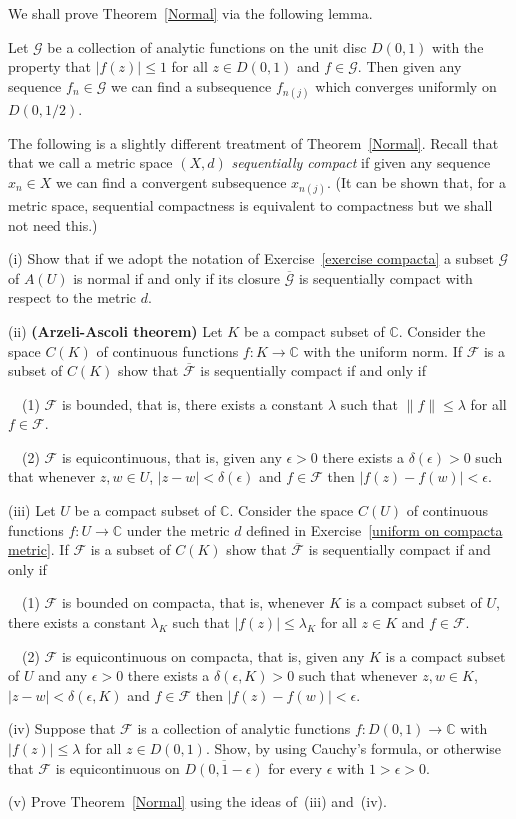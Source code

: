 We shall prove Theorem~\ref{Normal} via the following
lemma.
\begin{lemma} Let $\mathcal{G}$ be a collection
of analytic functions on the unit disc $D(0,1)$
with the property that $|f(z)|\leq 1$ for all $z\in D(0,1)$
and $f\in \mathcal{G}$. Then given any sequence
$f_{n}\in\mathcal{G}$ we can find a subsequence
$f_{n(j)}$ which converges uniformly on $D(0,1/2)$.
\end{lemma}                      
\begin{exercise} The following is a slightly different
treatment of Theorem~\ref{Normal}.
Recall that that we call a metric space $(X,d)$
\emph{sequentially compact} if given any sequence
$x_{n}\in X$ we can find a convergent subsequence
$x_{n(j)}$. (It can be shown that, for a metric space,
sequential compactness is equivalent to compactness
but we shall not need this.) 

(i) Show that if we adopt the notation
of Exercise~\ref{exercise compacta} a subset
$\mathcal{G}$ of $A(U)$ is normal if and only
if its closure $\overline{\mathcal{G}}$ 
is sequentially compact with respect to the metric $d$.

(ii) {\bf (Arzeli-Ascoli theorem)}
Let $K$ be a compact subset of ${\mathbb C}$. Consider the
space $C(K)$ of continuous functions $f:K\rightarrow{\mathbb C}$
with the uniform norm. If $\mathcal{F}$ is a subset of
$C(K)$ show that $\overline{\mathcal{F}}$ 
is sequentially compact if and only if

\ \ (1) $\mathcal{F}$ is bounded, that is, there exists
a constant $\lambda$ such that $\|f\|\leq\lambda$
for all $f\in \mathcal{F}$.

\ \ (2) $\mathcal{F}$ is equicontinuous, that is, given any
$\epsilon>0$ there exists a $\delta(\epsilon)>0$
such that whenever $z,w\in U$, $|z-w|<\delta(\epsilon)$
and $f\in\mathcal{F}$ then $|f(z)-f(w)|<\epsilon$.

(iii) Let $U$ be a compact subset of ${\mathbb C}$. Consider the
space $C(U)$ of continuous functions $f:U\rightarrow{\mathbb C}$
under the metric $d$ defined in 
Exercise~\ref{uniform on compacta metric}. 
If $\mathcal{F}$ is a subset of
$C(K)$ show that $\overline{\mathcal{F}}$ 
is sequentially compact if and only if

\ \ (1) $\mathcal{F}$ is bounded on compacta, 
that is, whenever $K$ is a compact subset of $U$,
there exists
a constant $\lambda_{K}$ such that $|f(z)|\leq\lambda_{K}$
for all $z\in K$ and $f\in \mathcal{F}$.

\ \ (2) $\mathcal{F}$ is equicontinuous on compacta, 
that is, given any $K$ is a compact subset of $U$ and any
$\epsilon>0$ there exists a $\delta(\epsilon,K)>0$
such that whenever $z,w\in K$, $|z-w|<\delta(\epsilon,K)$
and $f\in\mathcal{F}$ then $|f(z)-f(w)|<\epsilon$.

(iv) Suppose that $\mathcal{F}$ is a collection
of analytic functions
$f:D(0,1)\rightarrow{\mathbb C}$ with $|f(z)|\leq \lambda$
for all $z\in D(0,1)$. Show, by using Cauchy's
formula, or otherwise that $\mathcal{F}$
is equicontinuous on $\overline{D(0,1-\epsilon)}$ 
for every $\epsilon$ with $1>\epsilon>0$.

(v) Prove Theorem~\ref{Normal} using the ideas of~(iii)
and~(iv).    
\end{exercise}
